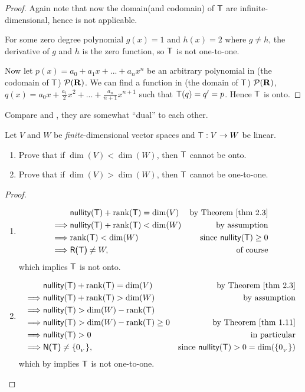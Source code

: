 \begin{proof}
Again note that now the domain(and codomain) of \(\textsf{T}\) are infinite-dimensional, hence  is not applicable.

For some zero degree polynomial \(g(x) = 1\) and \(h(x) = 2\) where \(g \ne h\), the derivative of \(g\) and \(h\) is the zero function, so \(\textsf{T}\) is not one-to-one.

Now let \(p(x) = a_0 + a_1 x + ... + a_n x^n\) be an arbitrary polynomial in (the codomain of \(\textsf{T}\)) \(\mathcal{P}(\mathbf{R})\).
We can find a function in (the domain of \(\textsf{T}\)) \(\mathcal{P}(\mathbf{R})\), \(q(x) = a_0 x + \frac{a_1}{2} x^2 + ... + \frac{a_n}{n + 1} x^{n + 1}\) such that \(\textsf{T}(q) = q' = p\).
Hence \(\textsf{T}\) is onto.
\end{proof}

\begin{note}
Compare  and , they are somewhat ``dual'' to each other.
\end{note}

\begin{exercise} \label{exercise 2.1.17}
Let \(V\) and \(W\) be \emph{finite}-dimensional vector spaces and \(\textsf{T}: V \to W\) be linear.
\begin{enumerate}
\item Prove that if \(\dim(V) < \dim(W)\), then \(\textsf{T}\) cannot be onto.
\item Prove that if \(\dim(V) > \dim(W)\), then \(\textsf{T}\) cannot be one-to-one.
\end{enumerate}
\end{exercise}

\begin{proof} \ 
\begin{enumerate}
\item
\begin{align*}
             & \nullityT + \rankT = \dim(V) & \text{by \THM{2.3}} \\
    \implies & \nullityT + \rankT < \dim(W) & \text{by assumption} \\
    \implies & \rankT < \dim(W) & \text{since \(\nullityT \ge 0\)} \\
    \implies & \RANGET \ne W, & \text{of course}
\end{align*}
which implies \(\textsf{T}\) is not onto.

\item
\begin{align*}
             & \nullityT + \rankT = \dim(V) & \text{by \THM{2.3}} \\
    \implies & \nullityT + \rankT > \dim(W) & \text{by assumption} \\
    \implies & \nullityT > \dim(W) - \rankT \\
    \implies & \nullityT > \dim(W) - \rankT \ge 0 & \text{by \THM{1.11}} \\
    \implies & \nullityT > 0 & \text{in particular} \\
    \implies & \NULLT \ne \{ \OV \}, & \text{since \(\nullityT > 0 = \dim(\{ \OV \})\)}
\end{align*}
which by  implies \(\textsf{T}\) is not one-to-one.
\end{enumerate}
\end{proof}


